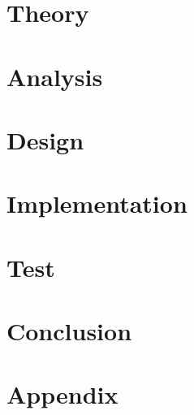 




 
\tableofcontents



\part{Theory}


\part{Analysis}

\part{Design}

\part{Implementation}

\part{Test}

\part{Conclusion}


\printbibliography

\part{Appendix}
\appendix

 
 
